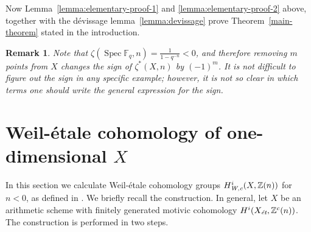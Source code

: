 \documentclass[draft]{article}
\DeclareMathOperator{\Spec}{Spec}
\newcommand{\FF}{\mathbb{F}}
\newcommand{\ZZ}{\mathbb{Z}}
\newcommand{\et}{\text{\it \'{e}t}}
\newcommand{\Wc}{\text{\it W,c}}
\theoremstyle{myplain}
\theoremstyle{mydefinition}
\newtheorem{remark}[theorem]{Remark}
\numberwithin{equation}{section}
\begin{document}
Now Lemma~\ref{lemma:elementary-proof-1} and \ref{lemma:elementary-proof-2}
above, together with the d\'{e}vissage lemma~\ref{lemma:devissage} prove
Theorem~\ref{main-theorem} stated in the introduction.

\begin{remark}
  Note that $\zeta (\Spec \FF_q, n) = \frac{1}{1 - q^{-n}} < 0$, and therefore
  removing $m$ points from $X$ changes the sign of $\zeta^* (X,n)$ by
  $(-1)^m$. It is not difficult to figure out the sign in any specific example;
  however, it is not so clear in which terms one should write the general
  expression for the sign.
\end{remark}


\section{Weil-\'{e}tale cohomology of one-dimensional $X$}
\label{sec:Weil-etale-cohomology-of-X}

In this section we calculate Weil-\'{e}tale cohomology groups $H^i_\Wc (X, \ZZ(n))$
for $n < 0$, as defined in \cite{Beshenov-Weil-etale-1}. We briefly recall the
construction. In general, let $X$ be an arithmetic scheme with finitely
generated motivic cohomology $H^i (X_\et, \ZZ^c(n))$. The construction is
performed in two steps.
\end{document}
